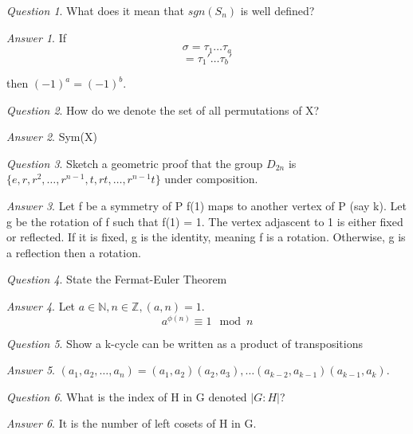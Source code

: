 \documentclass[]{article}
\theoremstyle{remark}
\theoremstyle{qnstyle}
\newtheorem{question}{Question}
\theoremstyle{answerstyle}
\newtheorem*{answer}{Answer}
\begin{document}
{
    \begin{question}
        What does it mean that $sgn(S_n)$ is well defined?
    \end{question}
    \begin{answer}
        If $$\sigma = \tau_1 \ldots \tau_a$$
        $$= \tau_1' \ldots \tau_b'$$

        then $(-1)^a = (-1)^b$.
    \end{answer}
}
{
    \begin{question}
        How do we denote the set of all permutations of X?
    \end{question}
    \begin{answer}
        Sym(X)
    \end{answer}
}
{
    \begin{question}
        Sketch a geometric proof that the group
        $D_{2n}$ is $\{e, r, r^2, \ldots, r^{n-1},t, rt, \ldots, r^{n-1}t \}$ 
        under composition.
    \end{question}
    \begin{answer}
        Let f be a symmetry of P
        f(1) maps to another vertex of P (say k).
        Let g be the rotation of f such that f(1) = 1.
        The vertex adjascent to 1 is either fixed or reflected.
        If it is fixed, g is the identity, meaning f is a rotation.
        Otherwise, g is a reflection then a rotation.
    \end{answer}
}
{
    \begin{question}
        State the Fermat-Euler Theorem
    \end{question}
    \begin{answer}
        Let $a \in \mathbb{N}, n \in \mathbb{Z}, (a,n) = 1.$
        $$a^{\phi(n)}  \equiv 1 \mod n$$
    \end{answer}
}
{
    \begin{question}
        Show a k-cycle can be written as a product of transpositions
    \end{question}
    \begin{answer}
        $(a_1, a_2, \ldots, a_n) = (a_1, a_2)(a_2, a_3), \ldots(a_{k-2}, a_{k-1})(a_{k-1}, a_k)$.

    \end{answer}
}
{
    \begin{question}
        What is the index of H in G denoted $\vert G:H \vert$?
    \end{question}
    \begin{answer}
        It is the number of left cosets of H in G.
    \end{answer}
}
\end{document}
